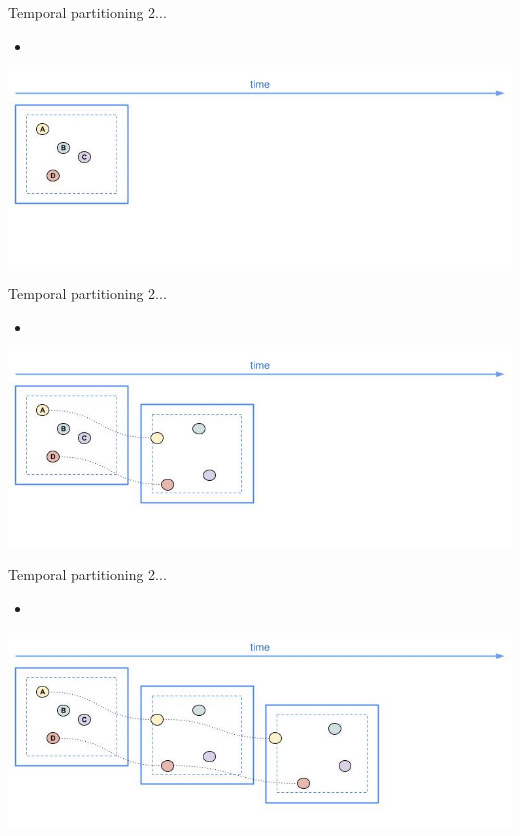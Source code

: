 \documentclass{beamer}
\begin{document}
\begin{frame}{Temporal partitioning 2...}
    \begin{itemize}
        \item %
    \end{itemize}

    \centering
    \includegraphics[width=\textwidth]{figures/temporal_phase_01.jpg}
\end{frame}
\begin{frame}{Temporal partitioning 2...}
    \begin{itemize}
        \item %
    \end{itemize}

    \centering
    \includegraphics[width=\textwidth]{figures/temporal_phase_02.jpg}
\end{frame}
\begin{frame}{Temporal partitioning 2...}
    \begin{itemize}
        \item %
    \end{itemize}

    \centering
    \includegraphics[width=\textwidth]{figures/temporal_phase_03.jpg}
\end{frame}
\end{document}
